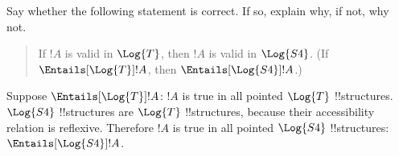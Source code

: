 \documentclass[../../../include/open-logic-section]{subfiles}
\begin{document}
\begin{prob}
    Say whether the following statement is correct. If so, explain why,
    if not, why not. 
    \begin{quote}
       If $!A$ is valid in $\Log{T}$, then $!A$ is valid in $\Log{S4}$. 
        (If $\Entails[\Log{T}]!A$, then $\Entails[\Log{S4}]!A$.)
    \end{quote}

    \begin{ans}
        Suppose $\Entails[\Log{T}]!A$: $!A$ is true in all pointed
        $\Log{T}$ !!{structure}s. $\Log{S4}$ !!{structure}s are $\Log{T}$
        !!{structure}s, because their accessibility relation is
        reflexive. Therefore $!A$ is true in all pointed $\Log{S4}$
        !!{structure}s: $\Entails[\Log{S4}]!A$.
    \end{ans}

\end{prob}
\end{document}
